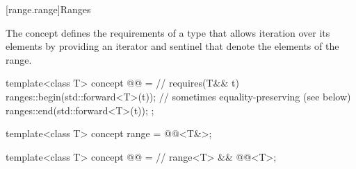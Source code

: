 [range.range]{Ranges}

\pnum
The  concept defines the requirements of a type that allows
iteration over its elements by providing an iterator and sentinel
that denote the elements of the range.

%
\begin{itemdecl}
template<class T>
  concept @@ =          // \expos
    requires(T&& t) {
      ranges::begin(std::forward<T>(t));        // sometimes equality-preserving (see below)
      ranges::end(std::forward<T>(t));
    };

template<class T>
  concept range = @@<T&>;

template<class T>
  concept @@ =    // \expos
    range<T> && @@<T>;
\end{itemdecl}

